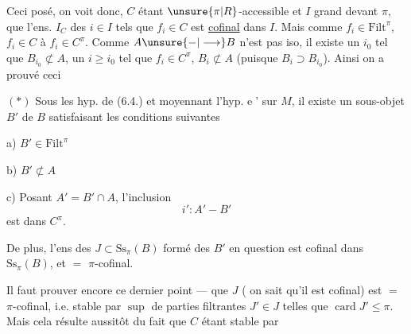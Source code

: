 Ceci posé, on voit donc, $C$ étant $\unsure{\pi|R}$-accessible et $I$ grand devant $\pi$, que l'ens. $I_C$ des $i\in I$ tels que $f_i\in C$ est \uline{cofinal} dans $I$. Mais  comme $f_i\in\mathrm{Filt}^\pi$, $f_i\in C$  à $f_i\in C^\pi$. Comme $A\unsure{-|\longrightarrow}B$ n'est pas iso, il existe un $i_0$ tel que $B_{i_0}\not\subset A$,   un $i\geq i_0$ tel que $f_i\in C^\pi$,  $B_i\not\subset A$ (puisque $B_i\supset B_{i_0}$). Ainsi on a prouvé ceci

$(\ast)$ Sous les hyp. de (6.4.) et moyennant l'hyp. \textcircled{e'} sur $M$, il existe un sous-objet $B'$ de $B$ satisfaisant les conditions suivantes

a) $B'\in\mathrm{Filt}^\pi$

b) $B'\not\subset A$

c) Posant $A'=B'\cap A$, l'inclusion
\[
 i':A'-B'
\]
est dans $C^\pi$.

De plus, l'ens des $J\subset\mathrm{Ss}_\pi(B)$ formé des $B'$ en question est cofinal dans $\mathrm{Ss}_\pi(B)$, et $=$ $\pi$-cofinal.

Il faut prouver encore ce dernier point --- que $J$ ( on sait qu'il est cofinal) est $=$ $\pi$-cofinal,  i.e. stable par $\sup$  de  parties filtrantes $J'\in J$ telles que $\operatorname{card}J'\leq\pi$. Mais cela résulte aussitôt du fait que $C$ étant stable par
